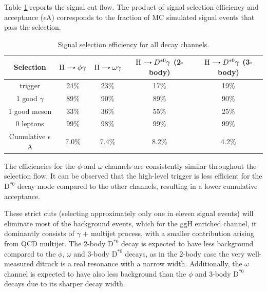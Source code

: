 Table \ref{tab:selection_efficiency} reports the signal cut flow. The product of signal selection efficiency and acceptance ($\epsilon$A) corresponds to the fraction of MC simulated signal events that pass the selection.
\begin{table}[!ht]
    \centering
    \begin{tabular}{|c|c|c|c|c|}
        \hline
        \cellcolor{lightgray}Selection &\cellcolor{lightgray}$\text{H}\decaysto \phi\gamma$ &\cellcolor{lightgray}$\text{H}\decaysto \omega\gamma$ &\cellcolor{lightgray}$\text{H}\decaysto D^{*0}\gamma$ {\scriptsize(2-body)}&\cellcolor{lightgray}$\text{H}\decaysto D^{*0}\gamma$ {\scriptsize(3-body)}\\ \hline
        trigger                                     & 24\%  & 23\%  & 17\%  & 19\% \\
        1 good $\gamma$                             & 89\%  & 90\%  & 89\%  & 90\% \\
        1 good meson                                & 33\%  & 36\%  & 55\%  & 25\% \\
        0 leptons                                   & 99\%  & 98\%  & 99\%  & 99\% \\ \hline
        Cumulative $\epsilon$A                      & 7.0\%  & 7.4\%  & 8.2\%  & 4.2\% \\
        \hline
        \end{tabular}
    \caption{Signal selection efficiency for all decay channels.}
    \label{tab:selection_efficiency}
\end{table}
The efficiencies for the $\phi$ and $\omega$ channels are consistently similar throughout the selection flow. It can be observed that the high-level trigger is less efficient for the $\text{D}^{*0}$ decay mode compared to the other channels, resulting in a lower cumulative acceptance.

These strict cuts (selecting approximately only one in eleven signal events) will eliminate most of the background events, which for the ggH enriched channel, it dominantly consists of $\gamma$ + multijet process, with a smaller contribution arising from QCD multijet. The 2-body $\text{D}^{*0}$ decay is expected to have less background compared to the $\phi$, $\omega$ and 3-body $\text{D}^{*0}$ decays, as in the 2-body case the very well-measured ditrack is a real resonance with a narrow width. Additionally, the $\omega$ channel is expected to have also less background than the $\phi$ and 3-body $\text{D}^{*0}$ decays due to its sharper decay width.

